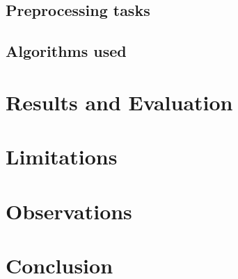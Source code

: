 \documentclass[10pt,a4paper,twocolumn]{article}
\begin{document}
\subsection{Preprocessing tasks}


\subsection{Algorithms used}


\section{Results and Evaluation}


\section{Limitations}


\section{Observations}


\section{Conclusion}


%



\appendix
\end{document}
